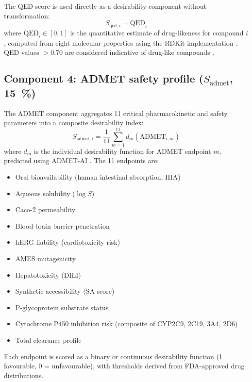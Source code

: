 \documentclass[journal=jcisd8,manuscript=suppinfo]{achemso}
\begin{document}
The QED score is used directly as a desirability component without transformation:
\begin{equation}
S_{\text{qed}, i} = \text{QED}_i
\label{eq:qed}
\end{equation}
where $\text{QED}_i \in [\num{0}, \num{1}]$ is the quantitative estimate of drug-likeness for compound $i$, computed from eight molecular properties using the RDKit implementation \cite{GregLandrum2025}. QED values $> \num{0.70}$ are considered indicative of drug-like compounds \cite{Lipinski2004}.

\subsection*{Component 4: ADMET safety profile ($S_{\text{admet}}$, \qty{15}{\percent})}

The ADMET component aggregates \num{11} critical pharmacokinetic and safety parameters into a composite desirability index:
\begin{equation}
S_{\text{admet}, i} = \frac{1}{11} \sum_{m=1}^{11} d_m(\text{ADMET}_{i,m})
\label{eq:admet}
\end{equation}
where $d_m$ is the individual desirability function for ADMET endpoint $m$, predicted using ADMET-AI \cite{Swanson2024}. The \num{11} endpoints are:

\begin{itemize}
\item Oral bioavailability (human intestinal absorption, HIA)
\item Aqueous solubility ($\log S$)
\item Caco-2 permeability
\item Blood-brain barrier penetration
\item hERG liability (cardiotoxicity risk)
\item AMES mutagenicity
\item Hepatotoxicity (DILI)
\item Synthetic accessibility (SA score)
\item P-glycoprotein substrate status
\item Cytochrome P450 inhibition risk (composite of CYP2C9, 2C19, 3A4, 2D6)
\item Total clearance profile
\end{itemize}

Each endpoint is scored as a binary or continuous desirability function (\num{1} = favourable, \num{0} = unfavourable), with thresholds derived from FDA-approved drug distributions.
\end{document}
